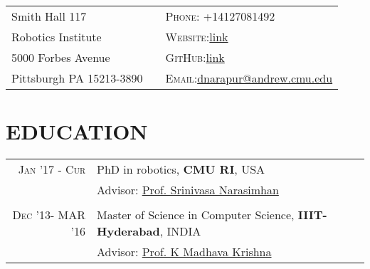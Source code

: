 \documentclass[7pt]{article}
\begin{document}
\begin{small}


\begin{table}[h!]

\begin{tabu}to 0.99\textwidth{X[l] X[c] X[l]}
Smith Hall 117 & & \textsc{Phone:} +14127081492 \\ 
Robotics Institute & & \textsc{Website:}\href{http://www.cs.cmu.edu/~dnarapur/} {link}\\
5000 Forbes Avenue & & \textsc{GitHub:}\href{https://github.com/dineshreddy91} {link} \\
Pittsburgh PA 15213-3890 & & \textsc{Email:}\href{dnarapur@andrew.cmu.edu} {dnarapur@andrew.cmu.edu}\\
\end{tabu}
\end{table}


\vspace{-4 mm}

\section{EDUCATION}
\begin{tabular}{rl}	
 \textsc{Jan '17 - Cur}  & PhD in robotics, {\bf CMU RI}, USA \\
 
 & 
\normalsize \small Advisor: \href{http://www.cs.cmu.edu/~srinivas/} {Prof. Srinivasa Narasimhan} \\
 
  \vspace{-2 mm}
&\\


 \textsc{Dec} '13- {MAR} '16 & Master of Science in Computer Science, \textbf{IIIT-Hyderabad}, INDIA\\
& 
\normalsize  \small Advisor: \href{https://www.iiit.ac.in/people/faculty/mkrishna/} {Prof. K Madhava Krishna} \\


\end{tabular}
\end{small}
\end{document}
